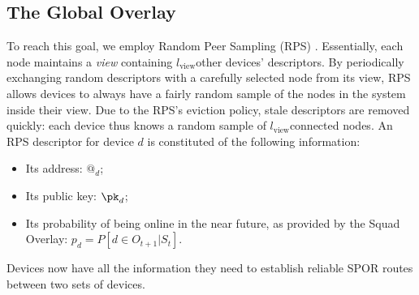 \subsection{The Global Overlay}
\label{sec:global_overlay}

\newcommand{\viewsize}{\ensuremath{l_{\text{view}}}}


To reach this goal, we employ Random Peer Sampling (RPS) \cite{Voulgaris_Gavidia_van_Steen_2005,Jelasity_Voulgaris_Guerraoui_Kermarrec_van_Steen_2007}.
Essentially, each node maintains a \emph{view} containing \viewsize other devices' descriptors. 
By periodically exchanging random descriptors with a carefully selected node from its view, RPS allows devices to always have a fairly random sample of the nodes in the system inside their view.
Due to the RPS's eviction policy, stale descriptors are removed quickly: each device thus knows a random sample of \viewsize connected nodes.
An RPS descriptor for device $d$ is constituted of the following information:
\begin{itemize}
  \item Its address: $@_d$;
  \item Its public key: \(\pk_d\);
  \item Its probability of being online in the near future, as provided by the Squad Overlay: $p_d=P\left[d \in O_{t+1} | S_t\right]$.
\end{itemize}

Devices now have all the information they need to establish reliable \ac{SPOR} 
routes between two sets of devices.






